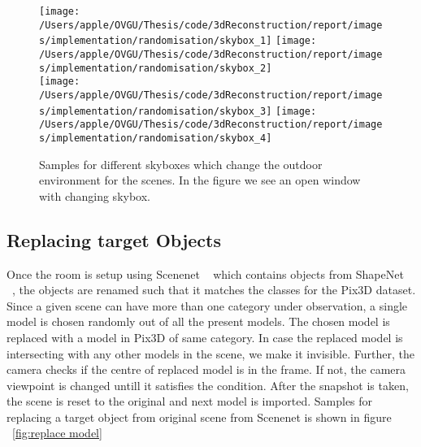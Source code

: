 \begin{figure}
    \centering
        \texttt{[image: /Users/apple/OVGU/Thesis/code/3dReconstruction/report/images/implementation/randomisation/skybox\_1]}
        \texttt{[image: /Users/apple/OVGU/Thesis/code/3dReconstruction/report/images/implementation/randomisation/skybox\_2]} \\
        \vspace{0.1cm}
        \texttt{[image: /Users/apple/OVGU/Thesis/code/3dReconstruction/report/images/implementation/randomisation/skybox\_3]}
        \texttt{[image: /Users/apple/OVGU/Thesis/code/3dReconstruction/report/images/implementation/randomisation/skybox\_4]}\\
    \caption{Samples for different skyboxes which change the outdoor environment for the scenes. In the figure we see an open window with changing skybox.}
    \label{fig:skybox samples}
\end{figure}

\subsection{Replacing target Objects}

Once the room is setup using Scenenet ~\cite{McCormac:etal:ICCV2017} which contains objects from ShapeNet ~\cite{chang2015shapenet}, the objects are renamed such that it matches the classes for the Pix3D dataset.
Since a given scene can have more than one category under observation, a single model is chosen randomly out of all the present models.
The chosen model is replaced with a model in Pix3D of same category.
In case the replaced model is intersecting with any other models in the scene, we make it invisible.
Further, the camera checks if the centre of replaced model is in the frame.
If not, the camera viewpoint is changed untill it satisfies the condition.
After the snapshot is taken, the scene is reset to the original and next model is imported.
Samples for replacing a target object from original scene from Scenenet is shown in figure ~\ref{fig:replace model}

